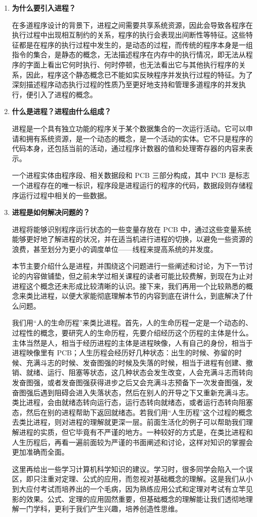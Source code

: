 \documentclass{ctexbook}
\begin{document}
	\begin{enumerate}
		\item \textbf{为什么要引入进程？}
		
		在多道程序设计的背景下，进程之间需要共享系统资源，因此会导致各程序在执行过程中出现相互制约的关系，程序的执行会表现出间断性等特征。这些特征都是在程序的执行过程中发生的，是动态的过程，而传统的程序本身是一组指令的集合，是静态的概念，无法描述程序在内存中的执行情况，即无法从程序的字面上看出它何时执行、何时停顿，也无法看出它与其他执行程序的关系，因此，程序这个静态概念已不能如实反映程序并发执行过程的特征。为了深刻描述程序动态执行过程的性质乃至更好地支持和管理多道程序的并发执行，便引入了进程的概念。
		
		\item \textbf{什么是进程？进程由什么组成？}
		
		进程是一个具有独立功能的程序关于某个数据集合的一次运行活动。它可以申请和拥有系统资源，是一个动态的概念，是一个活动的实体。它不只是程序的代码本身，还包括当前的活动，通过程序计数器的值和处理寄存器的内容来表示。
		
		一个进程实体由程序段、相关数据段和 PCB 三部分构成，其中 PCB 是标志一个进程存在的唯一标识，程序段是进程运行的程序的代码，数据段则存储程序运行过程中相关的一些数据。
		
		\item \textbf{进程是如何解决问题的？}
		
		进程将能够识别程序运行状态的一些变量存放在 PCB 中，通过这些变量系统能够更好地了解进程的状况，并在适当机进行进程的切换，以避免一些资源的浪费，甚至划分为更小的调度单位——线程来提高系统的并发度。
		
		本节主要介绍什么是进程，并围绕这个问题进行一些阐述和讨论，为下一节讨论的内容做铺垫，但之前未学过相关课程的读者可能比较费解，到现在为止对进程这个概念还未形成比较清晰的认识。接下来，我们再用一个比较熟悉的概念来类比进程，以便大家能彻底理解本节的内容到底在讲什么，到底解决了什么问题。
		
		我们用“人的生命历程”来类比进程。首先，人的生命历程一定是一个动态的、过程性的概念，要研究人的生命历程，先要介绍经历这个历程的主体是什么。主体当然是人，相当于经历进程的主体是进程映像，人有自己的身份，相当于进程映像里有 PCB；人生历程会经历好几种状态：出生的时候、弥留的时候、充满斗志的时候、发奋图强的时候及失落的时候，相当于进程有创建、撤销、就绪、运行、阻塞等状态，这几种状态会发生改变，人会充满斗志而转向发奋图强，或者发奋图强获得进步之后又会充满斗志预备下一次发奋图强，发奋图强后遇到阻碍会进入失落状态，然后在别人的开导之下又重新充满斗志。类比进程，会由就绪态转向运行态，运行态转向就绪态，或者运行态转向阻塞态，然后在别的进程帮助下返回就绪态。若我们用“人生历程”这个过程的概念去类比进程，则对进程的理解就更深一层。前面生活化的例子可以帮助我们理解进程的实质，但它毕竟有不严谨的地方。一种较好的方式是，在类比进程和人生历程后，再看一遍前面较为严谨的书面阐述和讨论，这样对知识的掌握会更加准确而全面。
		
		这里再给出一些学习计算机科学知识的建议。学习时，很多同学会陷入一个误区，即只注重对定理、公式的应用，而忽视对基础概念的理解。这是我们从小到大应付考试而培养出的一个毛病，因为熟练应用公式和定理对考试有立竿见影的效果。公式、定理的应用固然重要，但基础概念的理解能让我们透彻地理解一门学科，更利于我们产生兴趣，培养创造性思维。
	\end{enumerate}
	
\end{document}

